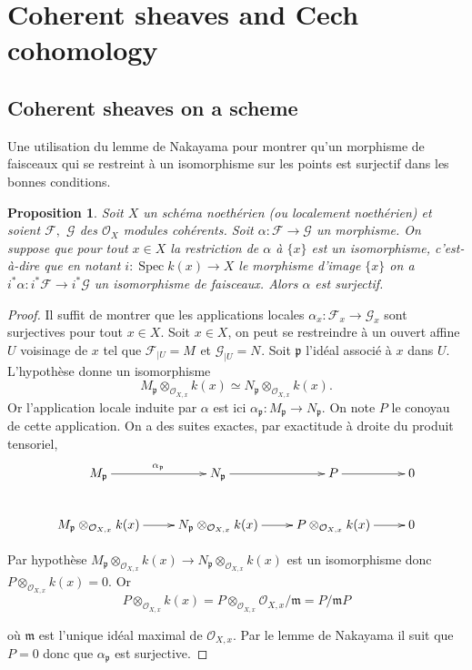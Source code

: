 \documentclass[A4, 11pt]{article}
\newtheorem{prop}[defin]{Proposition}
\def\Spec{ \operatorname{Spec}}
\begin{document}
\section{Coherent sheaves and Cech cohomology}
\subsection{Coherent sheaves on a scheme}
Une utilisation du lemme de Nakayama pour montrer qu'un morphisme de faisceaux qui se restreint à un isomorphisme sur les points est surjectif dans les bonnes conditions.
\begin{prop} Soit $X$ un schéma noethérien (ou localement noethérien) et soient $\mathcal{F},$ $\mathcal{G}$ des $\mathcal{O}_X$ modules cohérents. Soit $\alpha \colon \mathcal{F}\rightarrow \mathcal{G}$ un morphisme. On suppose que pour tout $x\in X$ la restriction de $\alpha$ à $\{x\}$ est un isomorphisme, c'est-à-dire que en notant $i\colon \Spec k(x) \rightarrow X$ le morphisme d'image $\{x\}$ on a $i^* \alpha\colon i^*\mathcal{F}\rightarrow i^* \mathcal{G}$ un isomorphisme de faisceaux. Alors $\alpha$ est surjectif.
\end{prop}
\begin{proof}
Il suffit de montrer que les applications locales $\alpha_x\colon \mathcal{F}_x \rightarrow \mathcal{G}_x$ sont surjectives pour tout $x\in X$. Soit $x\in X$, on peut se restreindre à un ouvert affine $U$ voisinage de $x$ tel que $\mathcal{F}_{|U}=M^{\tilde{}}$ et $\mathcal{G}_{|U}=N^{\tilde{}}$. Soit $\mathfrak{p}$ l'idéal associé à $x$ dans $U$. L'hypothèse donne un isomorphisme 
$$M_{\mathfrak{p}} \otimes_{\mathcal{O}_{X,x}} k(x)\simeq N_{\mathfrak{p}} \otimes_{\mathcal{O}_{X,x}} k(x).$$
Or l'application locale induite par $\alpha$ est ici $\alpha_{\mathfrak{p}}\colon M_{\mathfrak{p}}\rightarrow N_{\mathfrak{p}}$. 
On note $P$ le conoyau de cette application. On a des suites exactes, par exactitude à droite du produit tensoriel,
$$\xymatrix{
M_{\mathfrak{p}} \ar[r]^{\alpha_{\mathfrak{p}}} & N_{\mathfrak{p}} \ar[r] & P \ar[r] & 0 \\
M_{\mathfrak{p}}\otimes_{\mathcal{O}_{X,x}} k(x) \ar[r] & N_{\mathfrak{p}}\otimes_{\mathcal{O}_{X,x}} k(x) \ar[r]& P\otimes_{\mathcal{O}_{X,x}} k(x)\ar[r] & 0
}$$

Par hypothèse $M_{\mathfrak{p}}\otimes_{\mathcal{O}_{X,x}} k(x) \rightarrow  N_{\mathfrak{p}}\otimes_{\mathcal{O}_{X,x}} k(x)$ est un isomorphisme donc $P\otimes_{\mathcal{O}_{X,x}} k(x)=0$. Or 
$$P\otimes_{\mathcal{O}_{X,x}} k(x)=P\otimes_{\mathcal{O}_{X,x}} \mathcal{O}_{X,x}/\mathfrak{m}=P/ \mathfrak{m} P$$

 où $\mathfrak{m}$ est l'unique idéal maximal de $\mathcal{O}_{X,x}$. Par le lemme de Nakayama il suit que $P=0$ donc que $\alpha_{\mathfrak{p}}$ est surjective. 
\end{proof}
\end{document}
